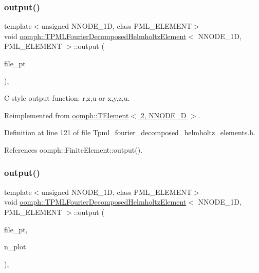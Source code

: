 \subsubsection{\texorpdfstring{output()}{output()}\hspace{0.1cm}{\footnotesize\ttfamily [3/4]}}
{\footnotesize\ttfamily template$<$unsigned N\+N\+O\+D\+E\+\_\+1D, class P\+M\+L\+\_\+\+E\+L\+E\+M\+E\+NT$>$ \\
void \hyperlink{classoomph_1_1TPMLFourierDecomposedHelmholtzElement}{oomph\+::\+T\+P\+M\+L\+Fourier\+Decomposed\+Helmholtz\+Element}$<$ N\+N\+O\+D\+E\+\_\+1D, P\+M\+L\+\_\+\+E\+L\+E\+M\+E\+NT $>$\+::output (\begin{DoxyParamCaption}\item[{F\+I\+LE $\ast$}]{file\+\_\+pt }\end{DoxyParamCaption})\hspace{0.3cm}{\ttfamily [inline]}, {\ttfamily [virtual]}}



C-\/style output function\+: r,z,u or x,y,z,u. 



Reimplemented from \hyperlink{classoomph_1_1TElement_3_012_00_01NNODE__1D_01_4_acf3bfd1c5a6462aa9555bc8451914e63}{oomph\+::\+T\+Element$<$ 2, N\+N\+O\+D\+E\+\_\+D $>$}.



Definition at line 121 of file Tpml\+\_\+fourier\+\_\+decomposed\+\_\+helmholtz\+\_\+elements.\+h.



References oomph\+::\+Finite\+Element\+::output().

\mbox{\label{classoomph_1_1TPMLFourierDecomposedHelmholtzElement_aec6440de61dd7cd76b77ddd7732744d4}} 
\subsubsection{\texorpdfstring{output()}{output()}\hspace{0.1cm}{\footnotesize\ttfamily [4/4]}}
{\footnotesize\ttfamily template$<$unsigned N\+N\+O\+D\+E\+\_\+1D, class P\+M\+L\+\_\+\+E\+L\+E\+M\+E\+NT$>$ \\
void \hyperlink{classoomph_1_1TPMLFourierDecomposedHelmholtzElement}{oomph\+::\+T\+P\+M\+L\+Fourier\+Decomposed\+Helmholtz\+Element}$<$ N\+N\+O\+D\+E\+\_\+1D, P\+M\+L\+\_\+\+E\+L\+E\+M\+E\+NT $>$\+::output (\begin{DoxyParamCaption}\item[{F\+I\+LE $\ast$}]{file\+\_\+pt,  }\item[{const unsigned \&}]{n\+\_\+plot }\end{DoxyParamCaption})\hspace{0.3cm}{\ttfamily [inline]}, {\ttfamily [virtual]}}



